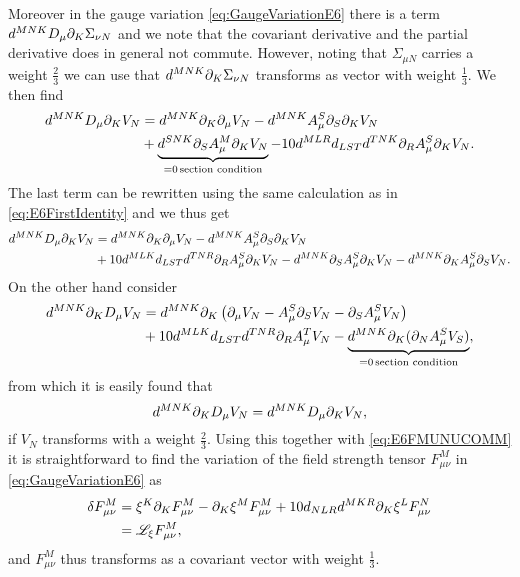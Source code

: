 Moreover in the gauge variation \eqref{eq:GaugeVariationE6} there is a term $d^{MNK}D_\mu\partial_K\Sigma_{\nu N}$ and we note that the covariant derivative and the partial derivative does in general not commute. However, noting that $\Sigma_{\mu N}$ carries a weight $\frac{2}{3}$ we can use that $d^{MNK}\partial_K\Sigma_{\nu N}$ transforms as vector with weight $\frac{1}{3}$. We then find
\begin{equation}
    \begin{aligned}
        d^{MNK}D_\mu\partial_KV_N&=d^{MNK}\partial_K\partial_\mu V_N-d^{MNK}A_{\mu}^S\partial_S\partial_KV_N\\
            &+\underbrace{d^{SNK}\partial_SA_\mu^M\partial_KV_N}_{=0\, \text{section condition}}-10d^{MLR}d_{LST}d^{TNK}\partial_RA_\mu^S\partial_KV_N.
    \end{aligned}
\end{equation}
The last term can be rewritten using the same calculation as in \eqref{eq:E6FirstIdentity} and we thus get 
\begin{equation}
    \begin{aligned}
        d^{MNK}D_\mu\partial_KV_N&=d^{MNK}\partial_K\partial_\mu V_N-d^{MNK}A_{\mu}^S\partial_S\partial_KV_N\\
            &+10d^{MLK}d_{LST}d^{TNR}\partial_RA_\mu^S\partial_KV_N-d^{MNK}\partial_SA_\mu^S\partial_KV_N-d^{MNK}\partial_KA_\mu^S\partial_SV_N.
    \end{aligned}
\end{equation}
On the other hand consider 
\begin{equation}
    \begin{aligned}
    d^{MNK}\partial_KD_\mu V_N &= d^{MNK}\partial_K\left(\partial_\mu V_N-A_\mu^S\partial_SV_N-\partial_SA_\mu^SV_N\right)\\
    &+10d^{MLK}d_{LST}d^{TNR}\partial_RA_\mu^TV_N-\underbrace{d^{MNK}\partial_K(\partial_NA_\mu^S V_S)}_{=0\, \text{section condition}},
    \end{aligned}
\end{equation}
from which it is easily found that
\begin{equation}
    d^{MNK}\partial_KD_\mu V_N= d^{MNK}D_\mu\partial_KV_N,
\end{equation}
if $V_N$ transforms with a weight $\frac{2}{3}$. Using this together with \eqref{eq:E6FMUNUCOMM} it is straightforward to find the variation of the field strength tensor $F_{\mu\nu}^M$ in \eqref{eq:GaugeVariationE6} as 
\begin{equation}
    \begin{aligned}
    \delta F_{\mu\nu}^M &= \xi^K\partial_KF_{\mu\nu}^M-\partial_K\xi^MF_{\mu\nu}^M+10d_{NLR}d^{MKR}\partial_K\xi^LF_{\mu\nu}^N\\
    &= \mathscr{L}_\xi F_{\mu\nu}^M,
    \end{aligned}
\end{equation}
and $F_{\mu\nu}^M$ thus transforms as a covariant vector with weight $\frac{1}{3}$. 


